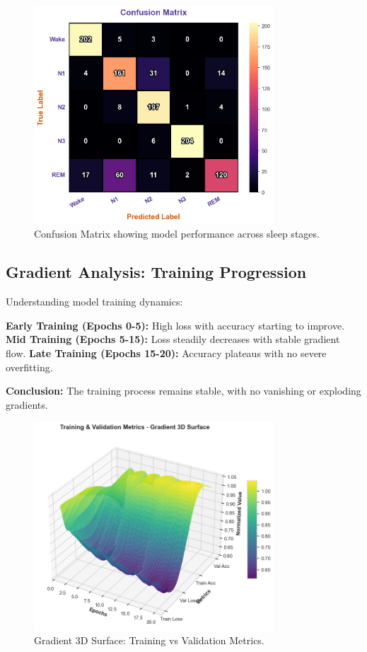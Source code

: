 \begin{figure}[h!]
    \centering
    \includegraphics[width=0.8\textwidth]{img/confusion matrix samples.png}
    \caption{Confusion Matrix showing model performance across sleep stages.}
\end{figure}

\subsection{Gradient Analysis: Training Progression}

Understanding model training dynamics:

\textbf{Early Training (Epochs 0-5):} High loss with accuracy starting to improve.  
\textbf{Mid Training (Epochs 5-15):} Loss steadily decreases with stable gradient flow.  
\textbf{Late Training (Epochs 15-20):} Accuracy plateaus with no severe overfitting.

\textbf{Conclusion:} The training process remains stable, with no vanishing or exploding gradients.

\begin{figure}[h!]
    \centering
    \includegraphics[width=0.8\textwidth]{img/3d gradient.png}
    \caption{Gradient 3D Surface: Training vs Validation Metrics.}
\end{figure}

